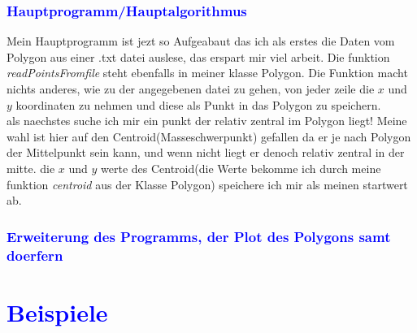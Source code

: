 \documentclass{article}
\begin{document}
\subsubsection{\textcolor{blue}{Hauptprogramm/Hauptalgorithmus}}
Mein Hauptprogramm ist jezt so Aufgeabaut das ich als erstes die Daten vom Polygon aus einer .txt datei auslese, das erspart mir viel arbeit. Die funktion \textit{readPointsFromfile} steht ebenfalls in meiner klasse Polygon. Die Funktion macht nichts anderes, wie zu der angegebenen datei zu gehen, von jeder zeile die $x$ und $y$ koordinaten zu nehmen und diese als Punkt in das Polygon zu speichern. 
\\
als naechstes suche ich mir ein punkt der relativ zentral im Polygon liegt! Meine wahl ist hier auf den Centroid(Masseschwerpunkt) gefallen da er je nach Polygon der Mittelpunkt sein kann, und wenn nicht liegt er denoch relativ zentral in der mitte. die $x$ und $y$ werte des Centroid(die Werte bekomme ich durch meine funktion \textit{centroid} aus der Klasse Polygon) speichere ich mir als meinen startwert ab.
\subsubsection{\textcolor{blue}{Erweiterung des Programms, der Plot des Polygons samt doerfern}}
\newpage
\section{\textcolor{blue}{Beispiele}}
\end{document}
